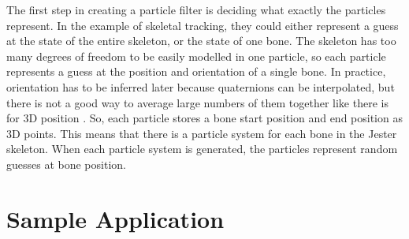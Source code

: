 The first step in creating a particle filter is deciding what exactly the particles represent. In the example of skeletal tracking, they could either represent a guess at the state of the entire skeleton, or the state of one bone. The skeleton has too many degrees of freedom to be easily modelled in one particle, so each particle represents a guess at the position and orientation of a single bone. In practice, orientation has to be inferred later because quaternions can be interpolated, but there is not a good way to average large numbers of them together like there is for 3D position \cite{markley2007averaging}. So, each particle stores a bone start position and end position as 3D points. This means that there is a particle system for each bone in the Jester skeleton. When each particle system is generated, the particles represent random guesses at bone position. 



\section{Sample Application}\label{sec:app_impl}

